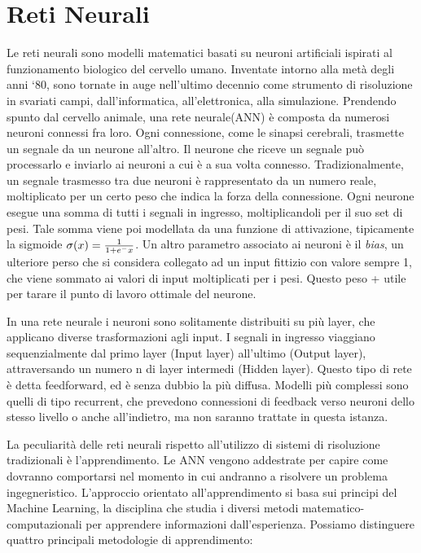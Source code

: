 \documentclass{article}
\begin{document}
\section{Reti Neurali}
Le reti neurali sono modelli matematici basati su neuroni artificiali ispirati al funzionamento biologico del cervello umano. Inventate intorno alla metà degli anni `80, sono tornate in auge nell'ultimo decennio come strumento di risoluzione in svariati campi, dall'informatica, all'elettronica, alla simulazione. 
Prendendo spunto dal cervello animale, una rete neurale(ANN) è composta da numerosi neuroni connessi fra loro. Ogni connessione, come le sinapsi cerebrali, trasmette un segnale da un neurone all'altro. Il neurone che riceve un segnale può processarlo e inviarlo ai neuroni a cui è a sua volta connesso. Tradizionalmente, un segnale trasmesso tra due neuroni è rappresentato da un numero reale, moltiplicato per un certo peso che indica la forza della connessione. Ogni neurone esegue una somma di tutti i segnali in ingresso, moltiplicandoli per il suo set di pesi. Tale somma viene poi modellata da una funzione di attivazione, tipicamente la sigmoide
$\sigma(x) = {1 \over 1+e^-x}$. Un altro parametro associato ai neuroni è il \textit{bias}, un ulteriore perso che si considera collegato ad un input fittizio con valore sempre 1, che viene sommato ai valori di input moltiplicati per i pesi. Questo peso + utile per tarare il punto di lavoro ottimale del neurone.

In una rete neurale i neuroni sono solitamente distribuiti su più layer, che applicano diverse trasformazioni agli input. I segnali in ingresso viaggiano sequenzialmente dal primo layer (Input layer) all'ultimo (Output layer), attraversando un numero n di layer intermedi (Hidden layer). Questo tipo di rete è detta feedforward, ed è senza dubbio la più diffusa. Modelli più complessi sono quelli di tipo recurrent, che prevedono connessioni di feedback verso neuroni dello stesso livello o anche all'indietro, ma non saranno trattate in questa istanza.

La peculiarità delle reti neurali rispetto all'utilizzo di sistemi di risoluzione tradizionali è l'apprendimento. Le ANN vengono addestrate per capire come dovranno comportarsi nel momento in cui andranno a risolvere un problema ingegneristico. L'approccio orientato all'apprendimento si basa sui principi del Machine Learning, la disciplina che studia i diversi metodi matematico-computazionali per apprendere informazioni dall'esperienza. Possiamo distinguere quattro principali metodologie di apprendimento:
\end{document}
